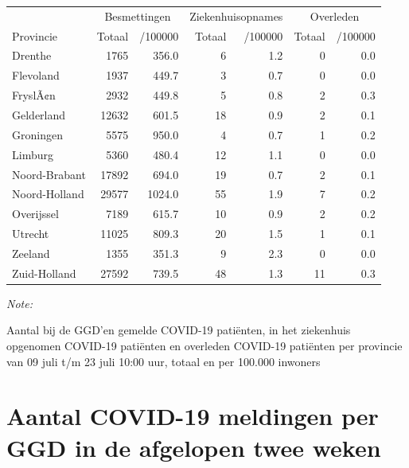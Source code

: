 \documentclass[
  english,
  man,floatsintext]{apa6}
\begin{document}
\begin{table}
\centering
\begin{threeparttable}
\begin{tabular}{lrrrrrr}
\toprule
\multicolumn{1}{c}{ } & \multicolumn{2}{c}{Besmettingen} & \multicolumn{2}{c}{Ziekenhuisopnames} & \multicolumn{2}{c}{Overleden} \\
\cmidrule(l{3pt}r{3pt}){2-3} \cmidrule(l{3pt}r{3pt}){4-5} \cmidrule(l{3pt}r{3pt}){6-7}
Provincie & Totaal & /100000 & Totaal & /100000 & Totaal & /100000\\
\midrule
Drenthe & 1765 & 356.0 & 6 & 1.2 & 0 & 0.0\\
Flevoland & 1937 & 449.7 & 3 & 0.7 & 0 & 0.0\\
FryslÃ¢n & 2932 & 449.8 & 5 & 0.8 & 2 & 0.3\\
Gelderland & 12632 & 601.5 & 18 & 0.9 & 2 & 0.1\\
Groningen & 5575 & 950.0 & 4 & 0.7 & 1 & 0.2\\
Limburg & 5360 & 480.4 & 12 & 1.1 & 0 & 0.0\\
Noord-Brabant & 17892 & 694.0 & 19 & 0.7 & 2 & 0.1\\
Noord-Holland & 29577 & 1024.0 & 55 & 1.9 & 7 & 0.2\\
Overijssel & 7189 & 615.7 & 10 & 0.9 & 2 & 0.2\\
Utrecht & 11025 & 809.3 & 20 & 1.5 & 1 & 0.1\\
Zeeland & 1355 & 351.3 & 9 & 2.3 & 0 & 0.0\\
Zuid-Holland & 27592 & 739.5 & 48 & 1.3 & 11 & 0.3\\
\bottomrule
\end{tabular}
\begin{tablenotes}
\item \textit{Note: } 
\item Aantal bij de GGD’en gemelde COVID-19 patiënten, in het ziekenhuis opgenomen COVID-19 patiënten en overleden COVID-19 patiënten per provincie van 09 juli t/m 23 juli 10:00 uur, totaal en per 100.000 inwoners
\end{tablenotes}
\end{threeparttable}
\end{table}

\newpage

\hypertarget{aantal-covid-19-meldingen-per-ggd-in-de-afgelopen-twee-weken}{%
\section{Aantal COVID-19 meldingen per GGD in de afgelopen twee weken}\label{aantal-covid-19-meldingen-per-ggd-in-de-afgelopen-twee-weken}}
\end{document}
